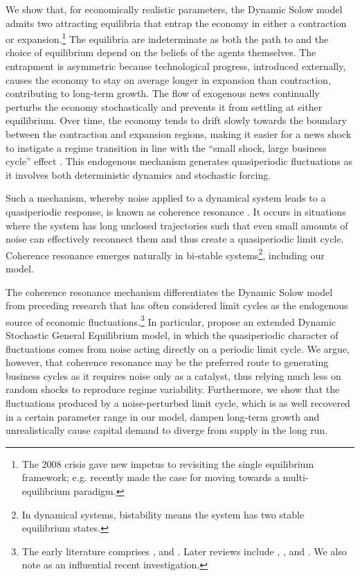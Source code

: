 \documentclass[authoryear, review]{elsarticle}
\begin{document}
We show that, for economically realistic parameters, the Dynamic Solow model admits two attracting equilibria that entrap the economy in either a contraction or expansion.\footnote{The 2008 crisis gave new impetus to revisiting the single equilibrium framework; e.g. \cite{VinesWills2020}  recently made the case for moving towards a multi-equilibrium paradigm.
} The equilibria are indeterminate \citep{BenhabibFarmer1999} as both the path to and the choice of equilibrium depend on the beliefs of the agents themselves. The entrapment is asymmetric because technological progress, introduced externally, causes the economy to stay on average longer in expansion than contraction, contributing to long-term growth. The flow of exogenous news continually perturbs the economy stochastically and prevents it from settling at either equilibrium. Over time, the economy tends to drift slowly towards the boundary between the contraction and expansion regions, making it easier for a news shock to instigate a regime transition in line with the “small shock, large business cycle” effect \citep{BernankeEtAl1996}. This endogenous mechanism generates quasiperiodic fluctuations as it involves both deterministic dynamics and stochastic forcing.

Such a mechanism, whereby noise applied to a dynamical system leads to a quasiperiodic response, is known as coherence resonance \citep{PikovskyKurths1997}. It occurs in situations where the system has long unclosed trajectories such that even small amounts of noise can effectively reconnect them and thus create a quasiperiodic limit cycle. Coherence resonance emerges naturally in bi-stable systems\footnote{In dynamical systems, bistability means the system has two stable equilibrium states.}, including our model.

The coherence resonance mechanism differentiates the Dynamic Solow model from preceding research that has often considered limit cycles as the endogenous source of economic fluctuations.\footnote{
	The early literature comprises \citet{Hicks1937}, \citet{Kaldor1940} and \citet{Goodwin1951}. Later reviews include \citet{BoldrinWoodford1990}, \citet{Scheinkman1990}, \citet{Lorenz1993} and \citet{Gandolfo2009}. We also note \citet{BeaudryEtAl2020} as an influential recent investigation. 
}
In particular, \citet{BeaudryEtAl2020} propose an extended Dynamic Stochastic General Equilibrium model, in which the quasiperiodic character of fluctuations comes from noise acting directly on a periodic limit cycle. We argue, however, that coherence resonance may be the preferred route to generating business cycles as it requires noise only as a catalyst, thus relying much less on random shocks to reproduce regime variability. Furthermore, we show that the fluctuations produced by a noise-perturbed limit cycle, which is as well recovered in a certain parameter range in our model, dampen long-term growth and unrealistically cause capital demand to diverge from supply in the long run.
\end{document}
